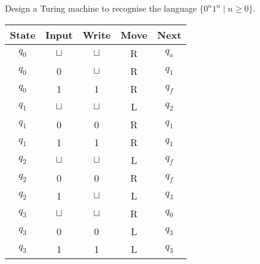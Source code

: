 \documentclass[a4paper, 12pt]{exam}
\begin{document}
\begin{questions}
\question
  Design a Turing machine to recognise the language \( \{ 0^n 1^n \mid n \geq 0 \} \).
  \begin{solution}
    \begin{table}[H]
      \centering
      \begin{tabular}{ccccc}
        \toprule
            State & Input & Write & Move & Next \\
        \midrule
            \( q_0 \) & \( \sqcup \) & \( \sqcup \) & R & \( q_a \) \\
            \( q_0 \) & 0        & \( \sqcup \) & R & \( q_1 \) \\
            \( q_0 \) & 1        & 1        & R & \( q_f \) \\
        \midrule
            \( q_1 \) & \( \sqcup \) & \( \sqcup \) & L & \( q_2 \) \\
            \( q_1 \) & 0        & 0        & R & \( q_1 \) \\
            \( q_1 \) & 1        & 1        & R & \( q_1 \) \\
        \midrule
            \( q_2 \) & \( \sqcup \) & \( \sqcup \) & L & \( q_f \) \\
            \( q_2 \) & 0        & 0        & R & \( q_f \) \\
            \( q_2 \) & 1        & \( \sqcup \) & L & \( q_3 \) \\
        \midrule
            \( q_3 \) & \( \sqcup \) & \( \sqcup \) & R & \( q_0 \) \\
            \( q_3 \) & 0        & 0        & L & \( q_3 \) \\
            \( q_3 \) & 1        & 1        & L & \( q_3 \) \\
        \bottomrule
        \hline
      \end{tabular}
    \end{table}
  \end{solution}



\end{questions}
\end{document}
